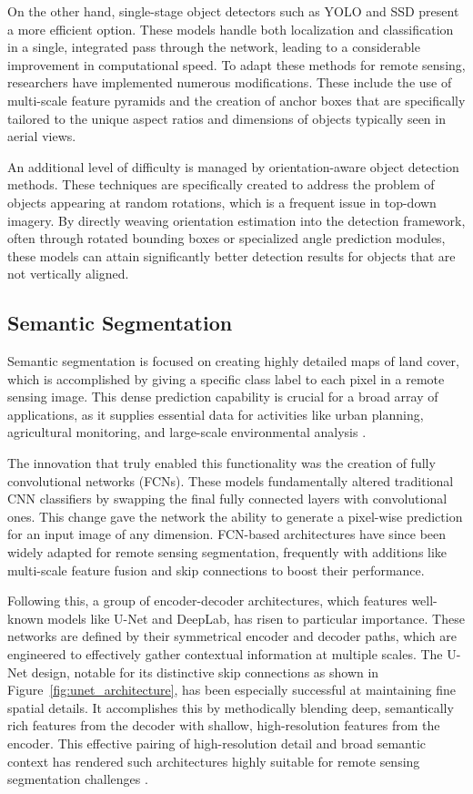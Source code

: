 \documentclass[12pt,a4paper]{article}
\begin{document}
On the other hand, single-stage object detectors such as YOLO and SSD present a more efficient option. These models handle both localization and classification in a single, integrated pass through the network, leading to a considerable improvement in computational speed. To adapt these methods for remote sensing, researchers have implemented numerous modifications. These include the use of multi-scale feature pyramids and the creation of anchor boxes that are specifically tailored to the unique aspect ratios and dimensions of objects typically seen in aerial views.

An additional level of difficulty is managed by orientation-aware object detection methods. These techniques are specifically created to address the problem of objects appearing at random rotations, which is a frequent issue in top-down imagery. By directly weaving orientation estimation into the detection framework, often through rotated bounding boxes or specialized angle prediction modules, these models can attain significantly better detection results for objects that are not vertically aligned.

\subsection{Semantic Segmentation}
Semantic segmentation is focused on creating highly detailed maps of land cover, which is accomplished by giving a specific class label to each pixel in a remote sensing image. This dense prediction capability is crucial for a broad array of applications, as it supplies essential data for activities like urban planning, agricultural monitoring, and large-scale environmental analysis \cite{maggiori2017end}.

The innovation that truly enabled this functionality was the creation of fully convolutional networks (FCNs). These models fundamentally altered traditional CNN classifiers by swapping the final fully connected layers with convolutional ones. This change gave the network the ability to generate a pixel-wise prediction for an input image of any dimension. FCN-based architectures have since been widely adapted for remote sensing segmentation, frequently with additions like multi-scale feature fusion and skip connections to boost their performance.

Following this, a group of encoder-decoder architectures, which features well-known models like U-Net and DeepLab, has risen to particular importance. These networks are defined by their symmetrical encoder and decoder paths, which are engineered to effectively gather contextual information at multiple scales. The U-Net design, notable for its distinctive skip connections as shown in Figure~\ref{fig:unet_architecture}, has been especially successful at maintaining fine spatial details. It accomplishes this by methodically blending deep, semantically rich features from the decoder with shallow, high-resolution features from the encoder. This effective pairing of high-resolution detail and broad semantic context has rendered such architectures highly suitable for remote sensing segmentation challenges \cite{liu2019learning}.
\end{document}
